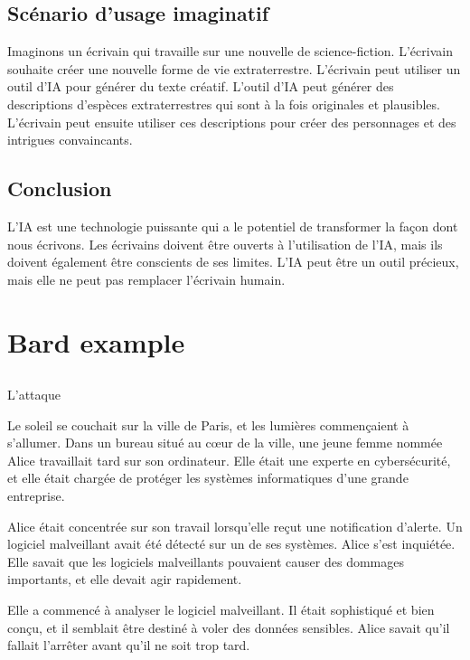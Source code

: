 \documentclass{./StyCls/MyArticle}
\begin{document}
\subsection{Scénario d'usage imaginatif}

Imaginons un écrivain qui travaille sur une nouvelle de science-fiction. L'écrivain souhaite créer une nouvelle forme de vie extraterrestre. L'écrivain peut utiliser un outil d'IA pour générer du texte créatif. L'outil d'IA peut générer des descriptions d'espèces extraterrestres qui sont à la fois originales et plausibles. L'écrivain peut ensuite utiliser ces descriptions pour créer des personnages et des intrigues convaincants.

\subsection{Conclusion}

L'IA est une technologie puissante qui a le potentiel de transformer la façon dont nous écrivons. Les écrivains doivent être ouverts à l'utilisation de l'IA, mais ils doivent également être conscients de ses limites. L'IA peut être un outil précieux, mais elle ne peut pas remplacer l'écrivain humain.

\section{Bard example}

\subsection{}

L'attaque

Le soleil se couchait sur la ville de Paris, et les lumières commençaient à s'allumer. Dans un bureau situé au cœur de la ville, une jeune femme nommée Alice travaillait tard sur son ordinateur. Elle était une experte en cybersécurité, et elle était chargée de protéger les systèmes informatiques d'une grande entreprise.

Alice était concentrée sur son travail lorsqu'elle reçut une notification d'alerte. Un logiciel malveillant avait été détecté sur un de ses systèmes. Alice s'est inquiétée. Elle savait que les logiciels malveillants pouvaient causer des dommages importants, et elle devait agir rapidement.

Elle a commencé à analyser le logiciel malveillant. Il était sophistiqué et bien conçu, et il semblait être destiné à voler des données sensibles. Alice savait qu'il fallait l'arrêter avant qu'il ne soit trop tard.
\end{document}
